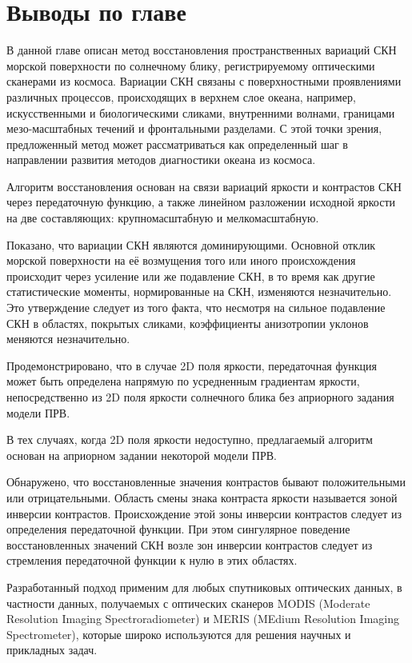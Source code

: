 \newpage



\section{Выводы по главе}

В данной главе описан метод восстановления пространственных вариаций СКН морской поверхности по солнечному блику, регистрируемому оптическими сканерами из космоса. Вариации СКН связаны с поверхностными проявлениями различных процессов, происходящих в верхнем слое океана, например, искусственными и биологическими сликами, внутренними волнами, границами мезо-масштабных течений и фронтальными разделами. С этой точки зрения, предложенный метод может рассматриваться как определенный шаг в направлении развития методов диагностики океана из космоса.

Алгоритм восстановления основан на связи вариаций яркости и контрастов СКН через передаточную функцию, а также линейном разложении исходной яркости на две составляющих: крупномасштабную и мелкомасштабную.

Показано, что вариации СКН являются доминирующими. Основной отклик морской поверхности на её возмущения того или иного происхождения происходит через усиление или же подавление СКН, в то время как другие статистические моменты, нормированные на СКН, изменяются незначительно. Это утверждение следует из того факта, что несмотря на сильное подавление СКН в областях, покрытых сликами, коэффициенты анизотропии уклонов меняются незначительно.

Продемонстрировано, что в случае 2D поля яркости, передаточная функция может быть определена напрямую по усредненным градиентам яркости, непосредственно из 2D поля яркости солнечного блика без априорного задания модели ПРВ.

В тех случаях, когда 2D поля яркости недоступно, предлагаемый алгоритм основан на априорном задании некоторой модели ПРВ.

Обнаружено, что восстановленные значения контрастов бывают положительными или отрицательными. Область смены знака контраста яркости называется зоной инверсии контрастов. Происхождение этой зоны инверсии контрастов следует из определения передаточной функции. При этом сингулярное поведение восстановленных значений СКН возле зон инверсии контрастов следует из стремления передаточной функции к нулю в этих областях.

Разработанный подход применим для любых спутниковых оптических данных, в частности данных, получаемых с оптических сканеров MODIS (Moderate Resolution Imaging Spectroradiometer) и MERIS (MEdium Resolution Imaging Spectrometer), которые широко используются для решения научных и прикладных задач.

